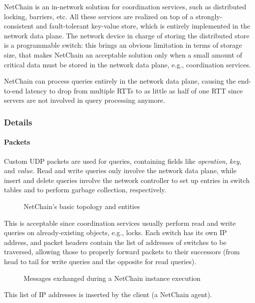 NetChain \cite{netchain} is an in-network solution for coordination services, such as distributed locking, barriers, etc.
All these services are realized on top of a strongly-consistent and fault-tolerant key-value store, which is entirely implemented in the network data plane.
The network device in charge of storing the distributed store is a programmable switch: this brings an obvious limitation in terms of storage size, that makes NetChain \cite{netchain} an acceptable solution only when a small amount of critical data must be stored in the network data plane, e.g., coordination services.\par
NetChain \cite{netchain} can process queries entirely in the network data plane, causing the end-to-end latency to drop from multiple RTTs to as little as half of one RTT since servers are not involved in query processing anymore.

\subsubsection{Details}
\paragraph{Packets}
Custom UDP packets are used for queries, containing fields like \textit{operation}, \textit{key}, and \textit{value}.
Read and write queries only involve the network data plane, while insert and delete queries involve the network controller to set up entries in switch tables and to perform garbage collection, respectively.

\begin{figure}[!htb]
    \centering
    \usebox{\netchainbasic}
    \caption{NetChain's \texorpdfstring{\cite{netchain}}{} basic topology and entities}
\end{figure}

This is acceptable since coordination services usually perform read and write queries on already-existing objects, e.g., locks.
Each switch has its own IP address, and packet headers contain the list of addresses of switches to be traversed, allowing those to properly forward packets to their successors (from head to tail for write queries and the opposite for read queries).
\begin{figure}[!htb]
    \centering
    \usebox{\netchainsd}
    \caption{Messages exchanged during a NetChain \texorpdfstring{\cite{netchain}}{} instance execution}
\end{figure}
This list of IP addresses is inserted by the client (a NetChain \cite{netchain} agent).

